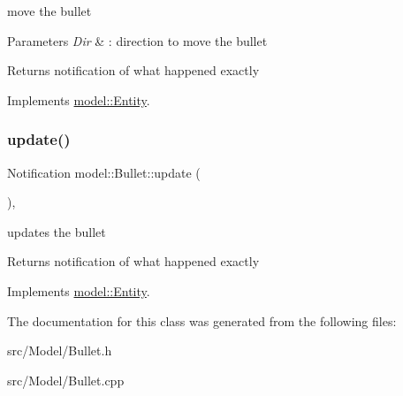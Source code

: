 move the bullet 


\begin{DoxyParams}{Parameters}
{\em Dir} & \+: direction to move the bullet \\
\hline
\end{DoxyParams}
\begin{DoxyReturn}{Returns}
notification of what happened exactly 
\end{DoxyReturn}


Implements \mbox{\hyperlink{classmodel_1_1_entity}{model\+::\+Entity}}.

\mbox{\label{classmodel_1_1_bullet_ac3e89bf8732f061ae9c4c92b7fce2680}} 
\subsubsection{\texorpdfstring{update()}{update()}}
{\footnotesize\ttfamily Notification model\+::\+Bullet\+::update (\begin{DoxyParamCaption}{ }\end{DoxyParamCaption})\hspace{0.3cm}{\ttfamily [override]}, {\ttfamily [virtual]}}



updates the bullet 

\begin{DoxyReturn}{Returns}
notification of what happened exactly 
\end{DoxyReturn}


Implements \mbox{\hyperlink{classmodel_1_1_entity}{model\+::\+Entity}}.



The documentation for this class was generated from the following files\+:\begin{DoxyCompactItemize}
\item 
src/\+Model/Bullet.\+h\item 
src/\+Model/Bullet.\+cpp\end{DoxyCompactItemize}
